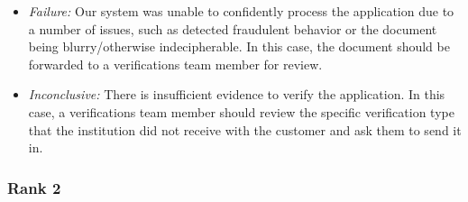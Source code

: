 \begin{itemize}[labelindent=0pt, wide]
\begin{itemize}
        \item \textit{Failure:} Our system was unable to confidently process the application due to a number of issues, such as detected fraudulent behavior or the document being blurry/otherwise indecipherable. In this case, the document should be forwarded to a verifications team member for review.
        
        \item \textit{Inconclusive:} There is insufficient evidence to verify the application. In this case, a verifications team member should review the specific verification type that the institution did not receive with the customer and ask them to send it in.
    \end{itemize}
\end{itemize}

\subsubsection{Rank 2}

